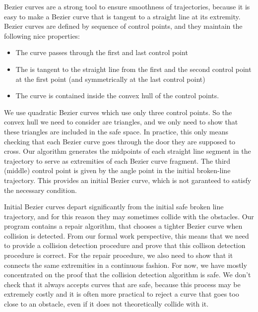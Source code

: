 \documentclass{easychair}
\begin{document}
Bezier curves are a strong tool to ensure smoothness of trajectories, because it is easy
to make a Bezier curve that is tangent to a straight line at its extremity.  Bezier curves
are defined by sequence of control points, and they maintain the following nice properties:
\begin{itemize}
\item The curve passes through the first and last control point
\item The is tangent to the straight line from the first and the second control point at
the first point (and symmetrically at the last control point)
\item The curve is contained inside the convex hull of the control points.
\end{itemize}
We use quadratic Bezier curves which use only three control points.  So the convex
hull we need to consider are triangles, and we only need to show that these
triangles are included in the safe space.  In practice, this only means checking
that each Bezier curve goes through the door they are supposed to cross.  Our
algorithm generates the midpoints of each straight line segment in the trajectory
to serve as extremities of each Bezier curve fragment.  The third (middle) control
point is given by the angle point in the initial broken-line trajectory.  This
provides an initial Bezier curve, which is not garanteed to satisfy the necessary
condition.

Initial Bezier curves depart significantly from the initial safe broken line
trajectory, and for this reason they may sometimes collide with the obstacles.
Our program contains a repair algorithm, that chooses a tighter Bezier curve
when collision is detected.  From our formal work perspective, this means that
we need to provide a collision detection procedure and prove that this collison
detection procedure is correct.  For the repair procedure, we also need to show
that it connects the same extremities in a continuous fashion.  For now, we
have mostly concentrated on the proof that the collision detection algorithm
is safe.  We don't check that it always accepts curves that are safe, because
this process may be extremely costly and it is often more practical to reject
a curve that goes too close to an obstacle, even if it does not theoretically
collide with it.
\end{document}

